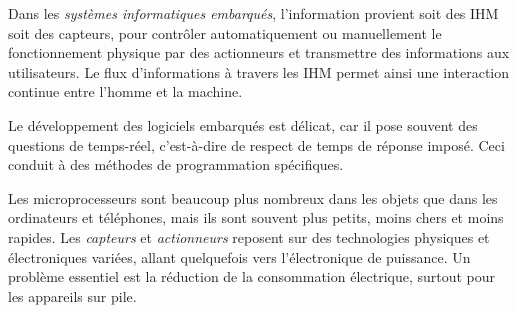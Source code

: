 
\begin{tcolorbox}[title={Données et information}, toprule=0pt, leftrule=0pt, rightrule=0pt, arc=0pt,
                  fonttitle=\scshape\boxtitlefont,
                  colbacktitle=white, coltitle=firstcolor, colframe=firstcolor, colback=firstcolor!10,
                  breakable, enhanced jigsaw]
Dans les \emph{systèmes informatiques embarqués}, l’information provient soit des IHM soit des capteurs, pour contrôler automatiquement ou manuellement le fonctionnement physique par des actionneurs et transmettre des informations aux utilisateurs. Le flux d’informations à travers les IHM permet ainsi une interaction continue entre l’homme et la machine.
\end{tcolorbox}

\begin{tcolorbox}[title={Algorithmes et programmes}, toprule=0pt, leftrule=0pt, rightrule=0pt, arc=0pt,
                  fonttitle=\scshape\boxtitlefont,
                  colbacktitle=white, coltitle=firstcolor, colframe=firstcolor, colback=firstcolor!10,
                  breakable, enhanced jigsaw]
Le développement des logiciels embarqués est délicat, car il pose souvent des questions de temps-réel, c’est-à-dire de respect de temps de réponse imposé. Ceci conduit à des méthodes de programmation spécifiques.
\end{tcolorbox}

\begin{tcolorbox}[title={Machines}, toprule=0pt, leftrule=0pt, rightrule=0pt, arc=0pt,
                  fonttitle=\scshape\boxtitlefont,
                  colbacktitle=white, coltitle=firstcolor, colframe=firstcolor, colback=firstcolor!10,
                  breakable, enhanced jigsaw]
Les microprocesseurs sont beaucoup plus nombreux dans les objets que dans les ordinateurs et téléphones, mais ils sont souvent plus petits, moins chers et moins rapides. Les \emph{capteurs} et \emph{actionneurs} reposent sur des technologies physiques et électroniques variées, allant quelquefois vers l’électronique de puissance. Un problème essentiel est la réduction de la consommation électrique, surtout pour les appareils sur pile.
\end{tcolorbox}


